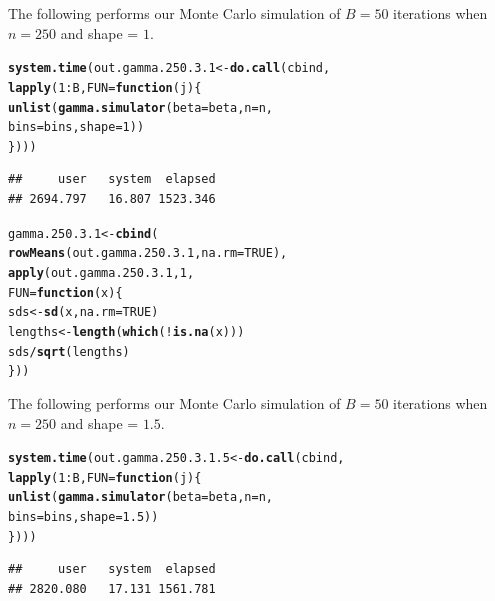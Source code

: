 \documentclass[11pt]{article}\usepackage[]{graphicx}\usepackage[]{color}
\makeatletter
\newcommand{\hlnum}[1]{\textcolor[rgb]{0.686,0.059,0.569}{#1}}%
\newcommand{\hlopt}[1]{\textcolor[rgb]{0,0,0}{#1}}%
\newcommand{\hlstd}[1]{\textcolor[rgb]{0.345,0.345,0.345}{#1}}%
\newcommand{\hlkwa}[1]{\textcolor[rgb]{0.161,0.373,0.58}{\textbf{#1}}}%
\newcommand{\hlkwb}[1]{\textcolor[rgb]{0.69,0.353,0.396}{#1}}%
\newcommand{\hlkwc}[1]{\textcolor[rgb]{0.333,0.667,0.333}{#1}}%
\newcommand{\hlkwd}[1]{\textcolor[rgb]{0.737,0.353,0.396}{\textbf{#1}}}%
\newenvironment{kframe}{%
 \def\at@end@of@kframe{}%
 \ifinner\ifhmode%
  \def\at@end@of@kframe{\end{minipage}}%
  \begin{minipage}{\columnwidth}%
 \fi\fi%
 \def\FrameCommand##1{\hskip\@totalleftmargin \hskip-\fboxsep
 \colorbox{shadecolor}{##1}\hskip-\fboxsep
     \hskip-\linewidth \hskip-\@totalleftmargin \hskip\columnwidth}%
 \MakeFramed {\advance\hsize-\width
   \@totalleftmargin\z@ \linewidth\hsize
   \@setminipage}}%
 {\par\unskip\endMakeFramed%
 \at@end@of@kframe}
\newenvironment{knitrout}{}{} %
\makeatother
\begin{document}
The following performs our Monte Carlo simulation of $B = 50$ iterations 
when $n = 250$ and shape = $1$.

\begin{knitrout}
\color{fgcolor}\begin{kframe}
\begin{alltt}
\hlkwd{system.time}\hlstd{(out.gamma.250.3.1} \hlkwb{<-} \hlkwd{do.call}\hlstd{(cbind,}
  \hlkwd{lapply}\hlstd{(}\hlnum{1}\hlopt{:}\hlstd{B,} \hlkwc{FUN} \hlstd{=} \hlkwa{function}\hlstd{(}\hlkwc{j}\hlstd{)\{}
    \hlkwd{unlist}\hlstd{(}\hlkwd{gamma.simulator}\hlstd{(}\hlkwc{beta} \hlstd{= beta,} \hlkwc{n} \hlstd{= n,}
      \hlkwc{bins} \hlstd{= bins,} \hlkwc{shape} \hlstd{=} \hlnum{1}\hlstd{))}
\hlstd{\})))}
\end{alltt}
\begin{verbatim}
##     user   system  elapsed 
## 2694.797   16.807 1523.346
\end{verbatim}
\end{kframe}
\end{knitrout}

\begin{knitrout}
\color{fgcolor}\begin{kframe}
\begin{alltt}
\hlstd{gamma.250.3.1} \hlkwb{<-} \hlkwd{cbind}\hlstd{(}
  \hlkwd{rowMeans}\hlstd{(out.gamma.250.3.1,} \hlkwc{na.rm} \hlstd{=} \hlnum{TRUE}\hlstd{),}
  \hlkwd{apply}\hlstd{(out.gamma.250.3.1,} \hlnum{1}\hlstd{,}
  \hlkwc{FUN} \hlstd{=} \hlkwa{function}\hlstd{(}\hlkwc{x}\hlstd{)\{}
    \hlstd{sds} \hlkwb{<-} \hlkwd{sd}\hlstd{(x,} \hlkwc{na.rm} \hlstd{=} \hlnum{TRUE}\hlstd{)}
    \hlstd{lengths} \hlkwb{<-} \hlkwd{length}\hlstd{(}\hlkwd{which}\hlstd{(}\hlopt{!}\hlkwd{is.na}\hlstd{(x)))}
    \hlstd{sds} \hlopt{/} \hlkwd{sqrt}\hlstd{(lengths)}
  \hlstd{\}))}
\end{alltt}
\end{kframe}
\end{knitrout}

The following performs our Monte Carlo simulation of $B = 50$ iterations 
when $n = 250$ and shape = $1.5$.

\begin{knitrout}
\color{fgcolor}\begin{kframe}
\begin{alltt}
\hlkwd{system.time}\hlstd{(out.gamma.250.3.1.5} \hlkwb{<-} \hlkwd{do.call}\hlstd{(cbind,}
  \hlkwd{lapply}\hlstd{(}\hlnum{1}\hlopt{:}\hlstd{B,} \hlkwc{FUN} \hlstd{=} \hlkwa{function}\hlstd{(}\hlkwc{j}\hlstd{)\{}
    \hlkwd{unlist}\hlstd{(}\hlkwd{gamma.simulator}\hlstd{(}\hlkwc{beta} \hlstd{= beta,} \hlkwc{n} \hlstd{= n,}
      \hlkwc{bins} \hlstd{= bins,} \hlkwc{shape} \hlstd{=} \hlnum{1.5}\hlstd{))}
\hlstd{\})))}
\end{alltt}
\begin{verbatim}
##     user   system  elapsed 
## 2820.080   17.131 1561.781
\end{verbatim}
\end{kframe}
\end{knitrout}
\end{document}
